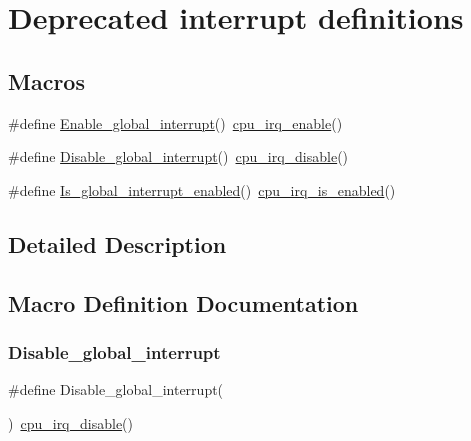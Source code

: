 \hypertarget{group__interrupt__deprecated__group}{}\section{Deprecated interrupt definitions}
\label{group__interrupt__deprecated__group}
\subsection*{Macros}
\begin{DoxyCompactItemize}
\item 
\#define \mbox{\hyperlink{group__interrupt__deprecated__group_gaebdc47e7800e11d79b9e5e2da1fecaa6}{Enable\+\_\+global\+\_\+interrupt}}()~\mbox{\hyperlink{sio2host_8c_aabffbc3734cb64b9456c2019f04eb782}{cpu\+\_\+irq\+\_\+enable}}()
\item 
\#define \mbox{\hyperlink{group__interrupt__deprecated__group_ga4834270e1b8984fe025bce15e7ae1564}{Disable\+\_\+global\+\_\+interrupt}}()~\mbox{\hyperlink{sio2host_8c_a378caf314c05fb6bb006623757eba684}{cpu\+\_\+irq\+\_\+disable}}()
\item 
\#define \mbox{\hyperlink{group__interrupt__deprecated__group_gab7b13c60d26b190e73e540586f1868f8}{Is\+\_\+global\+\_\+interrupt\+\_\+enabled}}()~\mbox{\hyperlink{group__interrupt__group_gae1545a2473614564550b9c4015c94978}{cpu\+\_\+irq\+\_\+is\+\_\+enabled}}()
\end{DoxyCompactItemize}


\subsection{Detailed Description}


\subsection{Macro Definition Documentation}
\mbox{\label{group__interrupt__deprecated__group_ga4834270e1b8984fe025bce15e7ae1564}} 
\subsubsection{\texorpdfstring{Disable\_global\_interrupt}{Disable\_global\_interrupt}}
{\footnotesize\ttfamily \#define Disable\+\_\+global\+\_\+interrupt(\begin{DoxyParamCaption}{ }\end{DoxyParamCaption})~\mbox{\hyperlink{sio2host_8c_a378caf314c05fb6bb006623757eba684}{cpu\+\_\+irq\+\_\+disable}}()}

